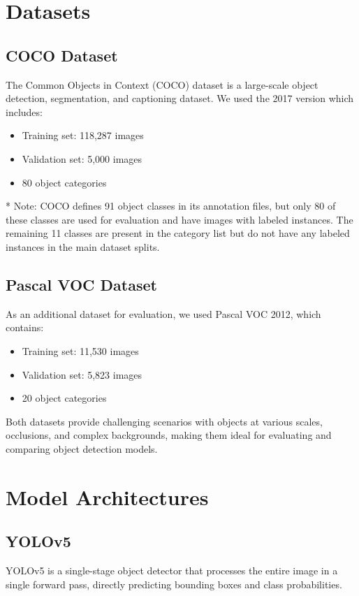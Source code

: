 \documentclass[12pt,a4paper]{article}
\begin{document}
\section{Datasets}
\subsection{COCO Dataset}
The Common Objects in Context (COCO) dataset is a large-scale object detection, segmentation, and captioning dataset. We used the 2017 version which includes:
\begin{itemize}
    \item Training set: 118,287 images
    \item Validation set: 5,000 images
    \item 80 object categories
\end{itemize}

* Note: COCO defines 91 object classes in its annotation files, but only 80 of these classes are used for evaluation and have images with labeled instances. The remaining 11 classes are present in the category list but do not have any labeled instances in the main dataset splits.



\subsection{Pascal VOC Dataset}
As an additional dataset for evaluation, we used Pascal VOC 2012, which contains:
\begin{itemize}
    \item Training set: 11,530 images
    \item Validation set: 5,823 images
    \item 20 object categories
\end{itemize}

Both datasets provide challenging scenarios with objects at various scales, occlusions, and complex backgrounds, making them ideal for evaluating and comparing object detection models.

\section{Model Architectures}
\subsection{YOLOv5}
YOLOv5 is a single-stage object detector that processes the entire image in a single forward pass, directly predicting bounding boxes and class probabilities.
\end{document}
